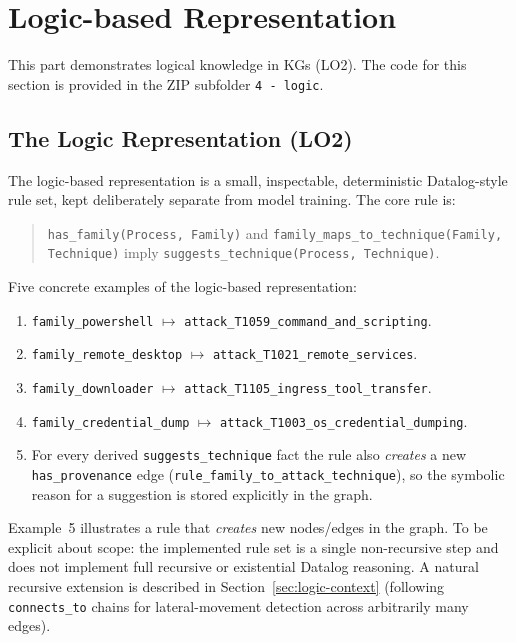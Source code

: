 \documentclass{article}
\begin{document}
\section{Logic-based Representation}
\label{sec:logic-representation}
This part demonstrates logical knowledge in KGs (LO2). The code for this
section is provided in the ZIP subfolder \texttt{4 - logic}.

\subsection{The Logic Representation (LO2)}
\label{sec:logic-detail}
The logic-based representation is a small, inspectable, deterministic
Datalog-style rule set, kept deliberately separate from model training. The
core rule is:
\begin{quote}
\texttt{has\_family(Process, Family)} and
\texttt{family\_maps\_to\_technique(Family, Technique)} imply
\texttt{suggests\_technique(Process, Technique)}.
\end{quote}
Five concrete examples of the logic-based representation:
\begin{enumerate}
    \item \texttt{family\_powershell} $\mapsto$
    \texttt{attack\_T1059\_command\_and\_scripting}.
    \item \texttt{family\_remote\_desktop} $\mapsto$
    \texttt{attack\_T1021\_remote\_services}.
    \item \texttt{family\_downloader} $\mapsto$
    \texttt{attack\_T1105\_ingress\_tool\_transfer}.
    \item \texttt{family\_credential\_dump} $\mapsto$
    \texttt{attack\_T1003\_os\_credential\_dumping}.
    \item For every derived \texttt{suggests\_technique} fact the rule also
    \emph{creates} a new \texttt{has\_provenance} edge
    (\texttt{rule\_family\_to\_attack\_technique}), so the symbolic reason for
    a suggestion is stored explicitly in the graph.
\end{enumerate}
Example~5 illustrates a rule that \emph{creates} new nodes/edges in the graph.
To be explicit about scope: the implemented rule set is a single
non-recursive step and does not implement full recursive or existential
Datalog reasoning. A natural recursive extension is described in
Section~\ref{sec:logic-context} (following \texttt{connects\_to} chains for
lateral-movement detection across arbitrarily many edges).
\end{document}
